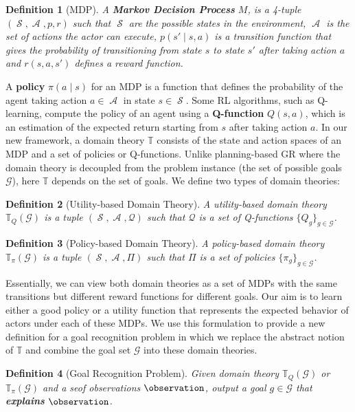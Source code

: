 \documentclass[letterpaper]{article} %
\DeclareMathOperator{\statespace}{\mathcal{S}}
\DeclareMathOperator{\actionspace}{\mathcal{A}}
\providecommand\theory{\mathbb{T}}
\providecommand\goals{\mathcal{G}}
\newtheorem{definition}{Definition}
\begin{document}
\begin{definition}[MDP]
A \textbf{Markov Decision Process} $M$, is a 4-tuple $(\statespace, \actionspace, p, r)$ such that $\statespace$ are the possible states in the environment, $\actionspace$ is the set of actions the actor can execute, $p(s' \mid s, a)$ is a transition function that gives the probability of transitioning from state $s$ to state $s'$ after taking action $a$ and $r(s, a, s')$ defines a reward function.
\end{definition}

A \textbf{policy} $\pi(a \mid s)$ for an MDP is a function that defines the probability of the agent taking action $a \in \actionspace$ in state $s \in \statespace$.
Some RL algorithms, such as Q-learning, compute the policy of an agent using a \textbf{Q-function} $Q(s,a)$, which is an estimation of the expected return starting from $s$ after taking action $a$. %
In our new framework, a domain theory $\theory$ consists of the state and action spaces of an MDP and a set of policies or Q-functions.
Unlike planning-based GR where the domain theory is decoupled from the problem instance (the set of possible goals $\goals$), here $\theory$ depends on the set of goals.
We define two types of domain theories:

\begin{definition}[Utility-based Domain Theory]
A utility-ba\-sed domain theory $\theory_Q(\goals)$ is a tuple $(\statespace, \actionspace, \mathcal{Q})$ such that $\mathcal{Q}$ is a set of Q-functions $\{Q_g\}_{g \in \goals}$.
\end{definition}

\begin{definition}[Policy-based Domain Theory]
A policy-ba\-sed domain theory $\theory_{\pi}(\goals)$ is a tuple $(\statespace, \actionspace, \Pi)$ such that $\Pi$ is a set of policies $\{\pi_g\}_{g \in \goals}$.
\end{definition}

Essentially, we can view both domain theories as a set of MDPs with the same transitions but different reward functions for different goals.
Our aim is to learn either a good policy or a utility function that represents the expected behavior of actors under each of these MDPs.
We use this formulation to provide a new definition for a goal recognition problem in which we replace the abstract notion of $\theory$ and combine the goal set $\goals$ into these domain theories.

\begin{definition}[Goal Recognition Problem]
Given domain theory $\theory_Q(\goals)$ or $\theory_{\pi}(\goals)$ and a seof observations $\observation$, output a goal $g\in \goals$ that \textbf{explains} $\observation$.
\end{definition}
\end{document}
